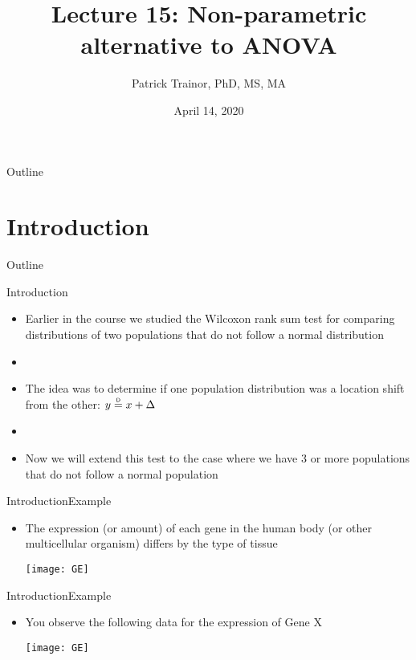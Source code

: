\documentclass[xcolor=dvipsnames]{beamer}
\title[Lecture 15]{Lecture 15: Non-parametric alternative to ANOVA}
\author[Patrick Trainor]{Patrick Trainor, PhD, MS, MA}
\institute[NMSU]{New Mexico State University}
\date{April 14, 2020}
\newcommand\myeq{\mathrel{\overset{\makebox[0pt]{\mbox{\normalfont\tiny\sffamily D}}}{=}}}
\begin{document}
	
\begin{frame}
	\maketitle
\end{frame}

\begin{frame}{Outline}
	\tableofcontents[hideallsubsections]
\end{frame}

\section{Introduction}

\begin{frame}{Outline}
	\tableofcontents[currentsection,subsectionstyle=show/shaded/hide]
\end{frame}

\begin{frame}{Introduction}
	\begin{itemize}
		\item Earlier in the course we studied the Wilcoxon rank sum test for comparing distributions of two populations that do not follow a normal distribution \pause
		\item[]
		\item The idea was to determine if one population distribution was a location shift from the other: $y \myeq x + \Delta$ \pause
		\item[]
		\item Now we will extend this test to the case where we have 3 or more populations that do not follow a normal population
	\end{itemize}
\end{frame}

\begin{frame}{Introduction}{Example}
	\begin{itemize}
		\item The expression (or amount) of each gene in the human body (or other multicellular organism) differs by the type of tissue 
		\begin{center}
			\texttt{[image: GE]}
		\end{center}
	\end{itemize}
\end{frame}

\begin{frame}{Introduction}{Example}
	\begin{itemize}
		\item You observe the following data for the expression of Gene X
		\begin{center}
			\texttt{[image: GE]}
		\end{center}
	\end{itemize}
\end{frame}
\end{document}
